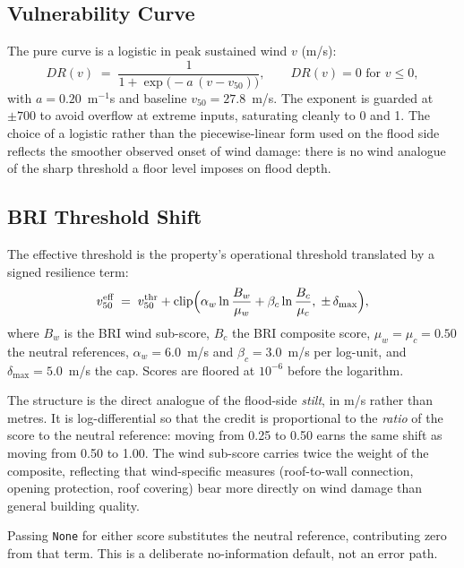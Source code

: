 \documentclass[11pt,a4paper]{article}
\begin{document}
\mkmframework

\subsection{Vulnerability Curve}
The pure curve is a logistic in peak sustained wind $v$ (m/s):
\[
  DR(v) \;=\; \frac{1}{1 + \exp\bigl(-a\,(v - v_{50})\bigr)},
  \qquad DR(v) = 0 \text{ for } v \le 0,
\]
with $a = 0.20$~m$^{-1}$s and baseline $v_{50} = 27.8$~m/s. The exponent is
guarded at $\pm 700$ to avoid overflow at extreme inputs, saturating cleanly to
0 and 1. The choice of a logistic rather than the piecewise-linear form used on
the flood side reflects the smoother observed onset of wind damage: there is no
wind analogue of the sharp threshold a floor level imposes on flood depth.

\subsection{BRI Threshold Shift}
The effective threshold is the property's operational threshold translated by a
signed resilience term:
\[
  v_{50}^{\text{eff}} \;=\; v_{50}^{\text{thr}}
    + \operatorname{clip}\Bigl(
        \alpha_w \ln\frac{B_w}{\mu_w}
      + \beta_c \ln\frac{B_c}{\mu_c},
      \;\pm\, \delta_{\max}\Bigr),
\]
where $B_w$ is the BRI wind sub-score, $B_c$ the BRI composite score,
$\mu_w = \mu_c = 0.50$ the neutral references, $\alpha_w = 6.0$~m/s and
$\beta_c = 3.0$~m/s per log-unit, and $\delta_{\max} = 5.0$~m/s the cap. Scores
are floored at $10^{-6}$ before the logarithm.

The structure is the direct analogue of the flood-side \emph{stilt}, in m/s
rather than metres. It is log-differential so that the credit is proportional to
the \emph{ratio} of the score to the neutral reference: moving from 0.25 to 0.50
earns the same shift as moving from 0.50 to 1.00. The wind sub-score carries
twice the weight of the composite, reflecting that wind-specific measures
(roof-to-wall connection, opening protection, roof covering) bear more directly
on wind damage than general building quality.

Passing \texttt{None} for either score substitutes the neutral reference,
contributing zero from that term. This is a deliberate no-information default,
not an error path.
\end{document}
